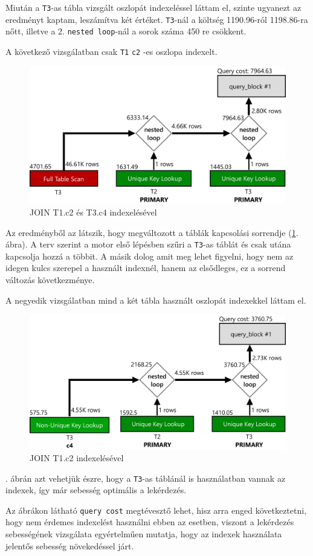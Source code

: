 Miután a \texttt{T3}-as tábla vizsgált oszlopát indexeléssel láttam el, szinte ugyanezt az eredményt kaptam, leszámítva két értéket. \texttt{T3}-nál a költség 1190.96-ról 1198.86-ra nőtt, illetve a 2. \texttt{nested loop}-nál a sorok száma 450 re csökkent.

\newpage

A következő vizsgálatban csak \texttt{T1} \texttt{c2} -es oszlopa indexelt.

\begin{figure}[h!]
\centering
\includegraphics[width=14cm]{images/explain/3-2.png}
\caption{JOIN T1.c2 és T3.c4 indexelésével}
\label{fig:explain_3_2}
\end{figure}

Az eredményből az látszik, hogy megváltozott a táblák kapcsolási sorrendje (\ref{fig:explain_3_2}. ábra). A terv szerint a motor első lépésben szűri a \texttt{T3}-as táblát és csak utána kapcsolja hozzá a többit. A másik dolog amit meg lehet figyelni, hogy nem az idegen kulcs szerepel a használt indexnél, hanem az elsődleges, ez a sorrend változás következménye.

A negyedik vizsgálatban mind a két tábla használt oszlopát indexekkel láttam el.

\begin{figure}[h!]
\centering
\includegraphics[width=14cm]{images/explain/3-3.png}
\caption{JOIN T1.c2 indexelésével}
\label{fig:explain_3_3}
\end{figure}

. ábrán azt vehetjük észre, hogy a \texttt{T3}-as táblánál is használatban vannak az indexek, így már sebesség optimális a lekérdezés.

Az ábrákon látható \texttt{query cost} megtévesztő lehet, hisz arra enged következtetni, hogy nem érdemes indexelést használni ebben az esetben, viszont a lekérdezés sebességének vizsgálata egyértelműen mutatja, hogy az indexek használata jelentős sebesség növekedéssel járt. 
